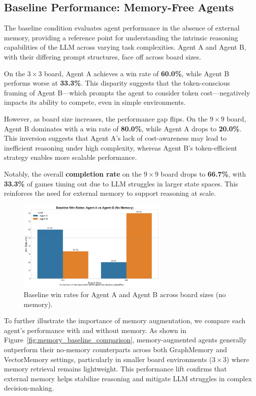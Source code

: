 \documentclass[10pt]{article}
\begin{document}
\subsection{Baseline Performance: Memory-Free Agents}

The baseline condition evaluates agent performance in the absence of external memory, providing a reference point for understanding the intrinsic reasoning capabilities of the LLM across varying task complexities. Agent A and Agent B, with their differing prompt structures, face off across board sizes.

On the $3\times3$ board, Agent A achieves a win rate of \textbf{60.0\%}, while Agent B performs worse at \textbf{33.3\%}. This disparity suggests that the token-conscious framing of Agent B---which prompts the agent to consider token cost---negatively impacts its ability to compete, even in simple environments.

However, as board size increases, the performance gap flips. On the $9\times9$ board, Agent B dominates with a win rate of \textbf{80.0\%}, while Agent A drops to \textbf{20.0\%}. This inversion suggests that Agent A's lack of cost-awareness may lead to inefficient reasoning under high complexity, whereas Agent B's token-efficient strategy enables more scalable performance.

Notably, the overall \textbf{completion rate} on the $9\times9$ board drops to \textbf{66.7\%}, with \textbf{33.3\%} of games timing out due to LLM struggles in larger state spaces. This reinforces the need for external memory to support reasoning at scale.

\begin{figure}[H]
\centering
\includegraphics[width=0.65\textwidth]{figures/memory_baseline/baseline_win_rates.png}
\caption{Baseline win rates for Agent A and Agent B across board sizes (no memory).}
\label{fig:baseline_win_rates}
\end{figure}

To further illustrate the importance of memory augmentation, we compare each agent's performance with and without memory. As shown in Figure~\ref{fig:memory_baseline_comparison}, memory-augmented agents generally outperform their no-memory counterparts across both GraphMemory and VectorMemory settings, particularly in smaller board environments ($3\times3$) where memory retrieval remains lightweight. This performance lift confirms that external memory helps stabilize reasoning and mitigate LLM struggles in complex decision-making.
\end{document}
